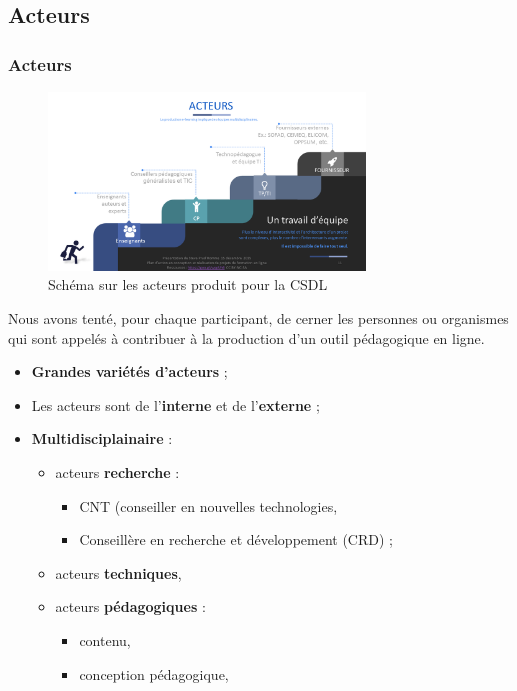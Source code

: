 		 \subsection{Acteurs} 
					\begin{frame}[allowframebreaks]
						\frametitle{Acteurs}
                        			\begin{figure}
                     			\centering
                    			 \includegraphics[width = 0.75\textwidth]{acteurs.png}
                     			\caption{\tiny{Schéma sur les acteurs produit pour la CSDL}}
                   			\end{figure}
                        			Nous avons tenté, pour chaque participant, de cerner les personnes ou organismes qui sont appelés à contribuer à la production d’un outil pédagogique en ligne.
							\begin{itemize}
							\item \textbf{Grandes variétés d'acteurs} ;
							\item Les acteurs sont de l'\textbf{interne} et de l'\textbf{externe} ;
							\item \textbf{Multidisciplainaire} :
								\begin{itemize}
								\item acteurs \textbf{recherche} : 
									\begin{itemize}
									\item CNT (conseiller en nouvelles technologies,
									\item Conseillère en recherche et développement (CRD) ;
									\end{itemize}
								\item acteurs\textbf{ techniques},												
								\item acteurs \textbf{pédagogiques} :
									\begin{itemize}
									\item contenu,
									\item conception pédagogique,

\end{itemize}
\end{itemize}
\end{itemize}
\end{frame}
